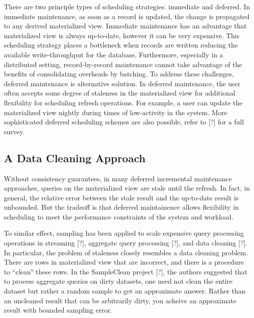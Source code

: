 There are two principle types of scheduling strategies: immediate and deferred. 
In immediate maintenance, as soon as a record is updated, 
the change is propagated to any derived materialized view.
Immediate maintenance has an advantage that materialized view is always up-to-date, 
however it can be very expensive.
This scheduling strategy places a bottleneck when records are written reducing 
the available write-throughput for the database.
Furthermore, especially in a distributed setting, record-by-record 
maintenance cannot take advantage of the benefits of consolidating overheads by batching.
To address these challenges, deferred maintenance is alternative solution.
In deferred maintenance, the user often accepts some degree of staleness in 
the materialized view for additional flexibility for scheduling refresh operations.
For example, a user can update the materialized view 
nightly during times of low-activity in the system.
More sophisticated deferred scheduling schemes are also possible, refer to [?] for a full survey.

\subsection{A Data Cleaning Approach}
Without consistency guarantees, in many deferred incremental maintenance approaches, 
queries on the materialized view are stale until the refresh.
In fact, in general, the relative error between the stale result and the up-to-date result is unbounded.
But the tradeoff is that deferred maintainence allows flexibility in scheduling to meet the performance constraints
of the system and workload.

To similar effect, sampling has been applied to scale expensive query processing operations in streaming [?], 
aggregate query processing [?], and data cleaning [?].
In particular, the problem of staleness closely resembles a data cleaning problem.
There are rows in materialized view that are incorrect, and there is a procedure to ``clean" these rows.
In the SampleClean project [?], the authors suggested that to process aggregate queries on dirty datasets, 
one need not clean the entire dataset but rather a random sample to get an approximate answer.
Rather than an uncleaned result that can be arbitrarily dirty, you acheive an approximate result with bounded sampling error. 

